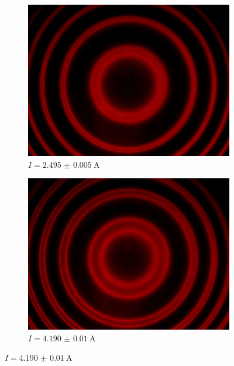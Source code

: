 	\begin{figure}[!ht]
	    \centering
	   	\begin{subfigure}{0.48\textwidth}
			\centering
			\includegraphics[width=\textwidth]{images/Capture_817.bmp.jpg}
			\caption{$I = \SI{2.495(5)}{\ampere}$}
			\label{fig:red_I2.495}
			\vspace{0.5\baselineskip}
		\end{subfigure}
		\hfill
		\begin{subfigure}{0.48\textwidth}
			\centering
			\includegraphics[width=\textwidth]{images/Capture_818.bmp.jpg}
			\caption{$I = \SI{4.190(10)}{\ampere}$}
			\label{fig:red_I4190}
			\vspace{0.5\baselineskip}
		\end{subfigure}

\end{figure}
